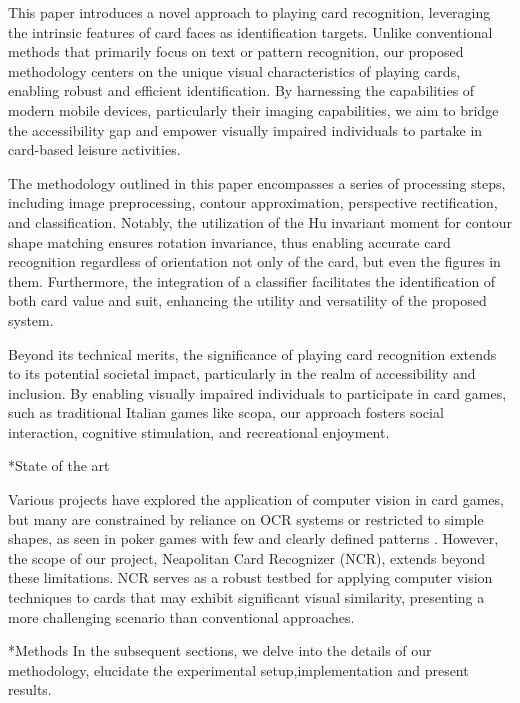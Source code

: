 \documentclass[twocolumn, a4paper,10pt]{article}
\makeatletter
\renewcommand\section{\@startsection{section}{1}{\z@}{3pt}{3pt}{\normalfont\large\bfseries}}
\renewcommand\subsection{\@startsection{subsection}{1}{\z@}{\z@}{\z@}{\normalfont\normalsize\bfseries}}
\renewcommand\subsection{\@startsection{subsection}{1}{\z@}{\z@}{0.1pt}{\normalfont\normalsize\bfseries}}
\makeatother
\begin{document}
This paper introduces a novel approach to playing card recognition, leveraging the intrinsic features of card faces as identification targets. Unlike conventional methods that primarily focus on text or pattern recognition, our proposed methodology centers on the unique visual characteristics of playing cards, enabling robust and efficient identification. By harnessing the capabilities of modern mobile devices, particularly their imaging capabilities, we aim to bridge the accessibility gap and empower visually impaired individuals to partake in card-based leisure activities.

The methodology outlined in this paper encompasses a series of processing steps, including image preprocessing, contour approximation, perspective rectification, and classification. Notably, the utilization of the Hu invariant moment for contour shape matching ensures rotation invariance, thus enabling accurate card recognition regardless of orientation not only of the card, but even the figures in them. Furthermore, the integration of a classifier facilitates the identification of both card value and suit, enhancing the utility and versatility of the proposed system.

Beyond its technical merits, the significance of playing card recognition extends to its potential societal impact, particularly in the realm of accessibility and inclusion. By enabling visually impaired individuals to participate in card games, such as traditional Italian games like scopa, our approach fosters social interaction, cognitive stimulation, and recreational enjoyment.

\subsection*{State of the art}

Various projects have explored the application of computer vision in card games, but many are constrained by reliance on OCR systems \citet{7972274} or restricted to simple shapes, as seen in poker games with few and clearly defined patterns \citet{9563607}. However, the scope of our project, Neapolitan Card Recognizer (NCR), extends beyond these limitations. NCR serves as a robust testbed for applying computer vision techniques to cards that may exhibit significant visual similarity, presenting a more challenging scenario than conventional approaches.


\section*{Methods}
In the subsequent sections, we delve into the details of our methodology, elucidate the experimental setup,implementation and present results.
\end{document}
